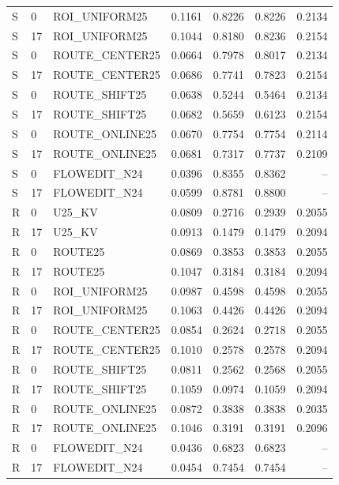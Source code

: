 \begin{longtable}{llp{.29\linewidth}rrrr}
S & 0 & ROI\_UNIFORM25 & 0.1161 & 0.8226 & 0.8226 & 0.2134 \\
S & 17 & ROI\_UNIFORM25 & 0.1044 & 0.8180 & 0.8236 & 0.2154 \\
S & 0 & ROUTE\_CENTER25 & 0.0664 & 0.7978 & 0.8017 & 0.2134 \\
S & 17 & ROUTE\_CENTER25 & 0.0686 & 0.7741 & 0.7823 & 0.2154 \\
S & 0 & ROUTE\_SHIFT25 & 0.0638 & 0.5244 & 0.5464 & 0.2134 \\
S & 17 & ROUTE\_SHIFT25 & 0.0682 & 0.5659 & 0.6123 & 0.2154 \\
S & 0 & ROUTE\_ONLINE25 & 0.0670 & 0.7754 & 0.7754 & 0.2114 \\
S & 17 & ROUTE\_ONLINE25 & 0.0681 & 0.7317 & 0.7737 & 0.2109 \\
S & 0 & FLOWEDIT\_N24 & 0.0396 & 0.8355 & 0.8362 & -- \\
S & 17 & FLOWEDIT\_N24 & 0.0599 & 0.8781 & 0.8800 & -- \\
R & 0 & U25\_KV & 0.0809 & 0.2716 & 0.2939 & 0.2055 \\
R & 17 & U25\_KV & 0.0913 & 0.1479 & 0.1479 & 0.2094 \\
R & 0 & ROUTE25 & 0.0869 & 0.3853 & 0.3853 & 0.2055 \\
R & 17 & ROUTE25 & 0.1047 & 0.3184 & 0.3184 & 0.2094 \\
R & 0 & ROI\_UNIFORM25 & 0.0987 & 0.4598 & 0.4598 & 0.2055 \\
R & 17 & ROI\_UNIFORM25 & 0.1063 & 0.4426 & 0.4426 & 0.2094 \\
R & 0 & ROUTE\_CENTER25 & 0.0854 & 0.2624 & 0.2718 & 0.2055 \\
R & 17 & ROUTE\_CENTER25 & 0.1010 & 0.2578 & 0.2578 & 0.2094 \\
R & 0 & ROUTE\_SHIFT25 & 0.0811 & 0.2562 & 0.2568 & 0.2055 \\
R & 17 & ROUTE\_SHIFT25 & 0.1059 & 0.0974 & 0.1059 & 0.2094 \\
R & 0 & ROUTE\_ONLINE25 & 0.0872 & 0.3838 & 0.3838 & 0.2035 \\
R & 17 & ROUTE\_ONLINE25 & 0.1046 & 0.3191 & 0.3191 & 0.2096 \\
R & 0 & FLOWEDIT\_N24 & 0.0436 & 0.6823 & 0.6823 & -- \\
R & 17 & FLOWEDIT\_N24 & 0.0454 & 0.7454 & 0.7454 & -- \\
\hline\end{longtable}
\endgroup

